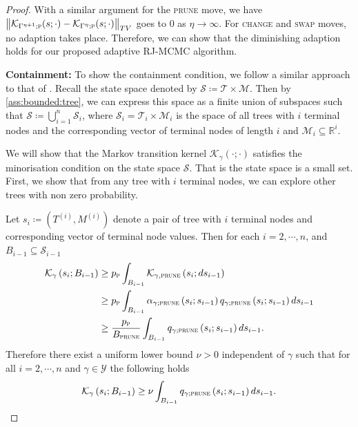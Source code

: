 \documentclass[
12pt]{article}
\begin{document}
\begin{proof}
	With a similar argument for the \textsc{prune} move, we have $\left\|\mathcal{K}_{\Gamma^{\eta+1};\textsc{p}}(s;\cdot)-\mathcal{K}_{\Gamma^{\eta};\textsc{p}}(s;\cdot)\right\|_{TV}$ goes to 0 as $\eta\to \infty$. For \textsc{change} and \textsc{swap} moves, no adaption takes place. Therefore, we can show that the diminishing adaption holds for our proposed adaptive RJ-MCMC algorithm.
	
	\textbf{Containment:}
	To show the containment condition, we follow a similar approach to that of \citet{andrieu_RJ_MCMC}. Recall the state space denoted by $\mathcal{S}\coloneqq\mathcal{T}\times\mathcal{M}$. Then by \cref{ass:bounded:tree}, we can express this space as a finite union of subspaces such that $\mathcal{S} \coloneq \bigcup_{i=1}^n \mathcal{S}_i$, where $\mathcal{S}_i = \mathcal{T}_i \times \mathcal{M}_i$ is the space of all trees with $i$ terminal nodes and the corresponding vector of terminal nodes of length $i$ and $\mathcal{M}_i\subseteq\mathbb{R}^i$. 
	
	We will show that the Markov transition kernel $\mathcal{K}_{\gamma}(\cdot;\cdot)$ satisfies the minorisation condition \citep{meyn_tweedie1994} on the state space $\mathcal{S}$. That is the state space is a small set. First, we show that from any tree with $i$ terminal nodes, we can explore other trees with non zero probability.
	
	Let $s_i \coloneqq\left(T^{(i)}, M^{(i)}\right)$ denote a pair of tree with $i$ terminal nodes and corresponding vector of terminal node values. Then for each $i=2,\cdots,n$, and $B_{i-1}\subseteq \mathcal{S}_{i-1}$
	\begin{align*}
		\mathcal{K}_{\gamma}\left(s_i;B_{i-1}\right)
		&\ge p_{\textsc{p}}\int_{B_{i-1}}\mathcal{K}_{\gamma,\textsc{prune}}\left(s_i;ds_{i-1}\right)\\
		&\ge p_{\textsc{p}}\int_{B_{i-1}}\alpha_{\gamma;\textsc{prune}}\left(s_i;s_{i-1}\right)q_{\gamma;\textsc{prune}}\left(s_i;s_{i-1}\right)ds_{i-1}\\
		&\ge \frac{p_{\textsc{p}}}{B_{\textsc{prune}}}\int_{B_{i-1}}q_{\gamma;\textsc{prune}}\left(s_i;s_{i-1}\right)ds_{i-1}.
	\end{align*}
	Therefore there exist a uniform lower bound $\nu>0$ independent of $\gamma$ such that for all $i=2,\cdots,n$ and $\gamma\in \mathcal{Y}$ the following holds
	\begin{equation}\label{eq:reach:trivial}
		\mathcal{K}_{\gamma}\left(s_i;B_{i-1}\right)
		\ge \nu\int_{B_{i-1}}q_{\gamma;\textsc{prune}}\left(s_i;s_{i-1}\right)ds_{i-1}.
	\end{equation}
	

\end{proof}
\end{document}
